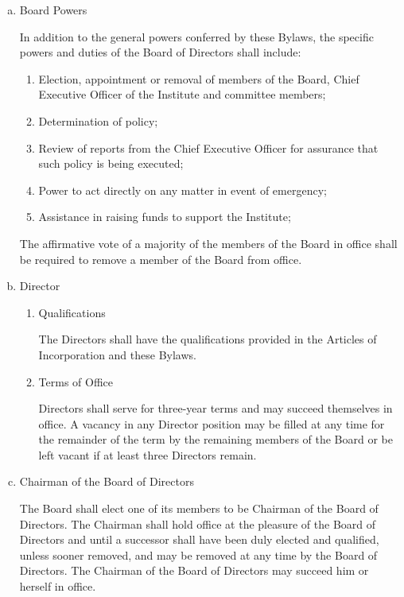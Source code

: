 \begin{enumerate}[(a)]
\item Board Powers

In addition to the general powers conferred by these Bylaws, the specific powers and duties of the Board of Directors shall include:

\begin{enumerate}
\item Election, appointment or removal of members of the Board, Chief Executive Officer of the Institute and committee members; 
\item Determination of policy;
\item Review of reports from the Chief Executive Officer for assurance that such policy is being executed;
\item Power to act directly on any matter in event of emergency;
\item Assistance in raising funds to support the Institute;
\end{enumerate}

The affirmative vote of a majority of the members of the Board in office shall be required to remove a member of the Board from office.

\item Director

\begin{enumerate}
\item Qualifications

The Directors shall have the qualifications provided in the Articles of Incorporation and these Bylaws. 

\item Terms of Office

Directors shall serve for three-year terms and may succeed themselves in office.  A vacancy in any Director position may be filled at any time for the remainder of the term by the remaining members of the Board or be left vacant if at least three Directors remain.

\end{enumerate}

\item Chairman of the Board of Directors

The Board shall elect one of its members to be Chairman of the Board of Directors. The Chairman shall hold office at the pleasure of the Board of Directors and until a successor shall have been duly elected and qualified, unless sooner removed, and may be removed at any time by the Board of Directors. The Chairman of the Board of Directors may succeed him or herself in office.

\end{enumerate}

